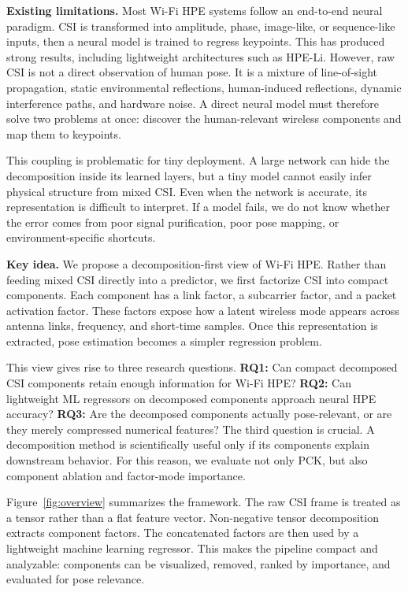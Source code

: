 \documentclass[letterpaper]{article}
\begin{document}
\textbf{Existing limitations.}
Most Wi-Fi HPE systems follow an end-to-end neural paradigm. CSI is transformed into amplitude, phase, image-like, or sequence-like inputs, then a neural model is trained to regress keypoints. This has produced strong results, including lightweight architectures such as HPE-Li. However, raw CSI is not a direct observation of human pose. It is a mixture of line-of-sight propagation, static environmental reflections, human-induced reflections, dynamic interference paths, and hardware noise. A direct neural model must therefore solve two problems at once: discover the human-relevant wireless components and map them to keypoints.

This coupling is problematic for tiny deployment. A large network can hide the decomposition inside its learned layers, but a tiny model cannot easily infer physical structure from mixed CSI. Even when the network is accurate, its representation is difficult to interpret. If a model fails, we do not know whether the error comes from poor signal purification, poor pose mapping, or environment-specific shortcuts.

\textbf{Key idea.}
We propose a decomposition-first view of Wi-Fi HPE. Rather than feeding mixed CSI directly into a predictor, we first factorize CSI into compact components. Each component has a link factor, a subcarrier factor, and a packet activation factor. These factors expose how a latent wireless mode appears across antenna links, frequency, and short-time samples. Once this representation is extracted, pose estimation becomes a simpler regression problem.

This view gives rise to three research questions. \textbf{RQ1:} Can compact decomposed CSI components retain enough information for Wi-Fi HPE? \textbf{RQ2:} Can lightweight ML regressors on decomposed components approach neural HPE accuracy? \textbf{RQ3:} Are the decomposed components actually pose-relevant, or are they merely compressed numerical features? The third question is crucial. A decomposition method is scientifically useful only if its components explain downstream behavior. For this reason, we evaluate not only PCK, but also component ablation and factor-mode importance.

Figure~\ref{fig:overview} summarizes the framework. The raw CSI frame is treated as a tensor rather than a flat feature vector. Non-negative tensor decomposition extracts component factors. The concatenated factors are then used by a lightweight machine learning regressor. This makes the pipeline compact and analyzable: components can be visualized, removed, ranked by importance, and evaluated for pose relevance.
\end{document}
